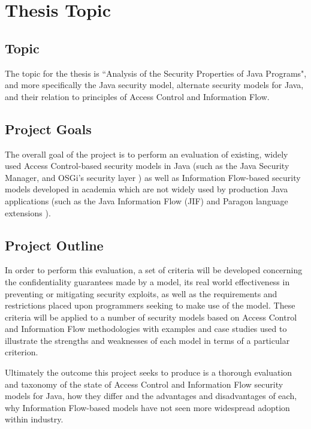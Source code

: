\section{Thesis Topic}

\subsection{Topic}

The topic for the thesis is ``Analysis of the Security Properties of Java Programs", and more specifically the Java security model, alternate security models for Java, and their relation to principles of Access Control and Information Flow. 

\subsection{Project Goals}

The overall goal of the project is to perform an evaluation of existing, widely used Access Control-based security models in Java (such as the Java Security Manager, and OSGi's security layer \cite{philippov2012security}) as well as Information Flow-based security models developed in academia which are not widely used by production Java applications (such as the Java Information Flow (JIF) and Paragon language extensions \cite{pullicino2014jif}\cite{broberg2013paragon}).

\subsection{Project Outline}

In order to perform this evaluation, a set of criteria will be developed concerning the confidentiality guarantees made by a model, its real world effectiveness in preventing or mitigating security exploits, as well as the requirements and restrictions placed upon programmers seeking to make use of the model. These criteria will be applied to a number of security models based on Access Control and Information Flow methodologies with examples and case studies used to illustrate the strengths and weaknesses of each model in terms of a particular criterion.

Ultimately the outcome this project seeks to produce is a thorough evaluation and taxonomy of the state of Access Control and Information Flow security models for Java, how they differ and the advantages and disadvantages of each, why Information Flow-based models have not seen more widespread adoption within industry.


